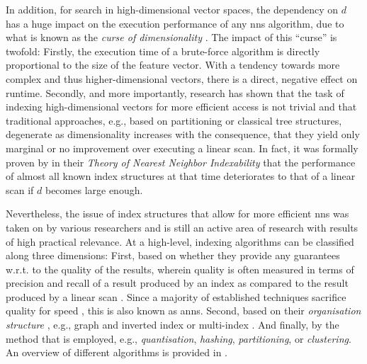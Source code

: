 In addition, for search in high-dimensional vector spaces, the dependency on $d$ has a huge impact on the execution performance of any \acrshort{nns} algorithm, due to what is known as the \emph{curse of dimensionality} \cite{Indyk1998:Approximate,Zezula:2006Similarity}. The impact of this ``curse'' is twofold: Firstly, the execution time of a brute-force algorithm is directly proportional to the size of the feature vector. With a tendency towards more complex and thus higher-dimensional vectors, there is a direct, negative effect on runtime. Secondly, and more importantly, research has shown that the task of indexing high-dimensional vectors for more efficient access is not trivial and that traditional approaches, e.g., based on partitioning or classical tree structures, degenerate as dimensionality increases \cite{Indyk1998:Approximate,Weber:1998Va} with the consequence, that they yield only marginal or no improvement over executing a linear scan. In fact, it was formally proven by \cite{Shaft:2006Theory} in their \emph{Theory of Nearest Neighbor Indexability} that the performance of almost all known index structures at that time deteriorates to that of a linear scan if $d$ becomes large enough.

Nevertheless, the issue of index structures that allow for more efficient \acrshort{nns} was taken on by various researchers and is still an active area of research with results of high practical relevance. At a high-level, indexing algorithms can be classified along three dimensions: First, based on whether they provide any guarantees w.r.t. to the quality of the results, wherein quality is often measured in terms of precision and recall of a result produced by an index as compared to the result produced by a linear scan \cite{Echihabi:2021High}. Since a majority of established techniques sacrifice quality for speed \cite{Siguroardottir:2005Quality}, this is also known as \acrfull{anns}. Second, based on their \emph{organisation structure} \cite{Shaft:2006Theory}, e.g., graph and inverted index \cite{Sivic:2003Video} or multi-index \cite{Babenko:2014Inverted}. And finally, by the method that is employed, e.g., \emph{quantisation}, \emph{hashing}, \emph{partitioning}, or \emph{clustering}. An overview of different algorithms is provided in .

